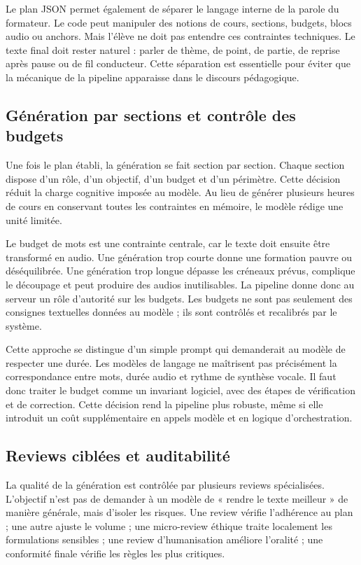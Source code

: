 \documentclass[12pt,a4paper]{article}
\begin{document}
Le plan JSON permet également de séparer le langage interne de la parole du formateur.
Le code peut manipuler des notions de cours, sections, budgets, blocs audio ou anchors.
Mais l'élève ne doit pas entendre ces contraintes techniques. Le texte final doit rester
naturel : parler de thème, de point, de partie, de reprise après pause ou de fil conducteur.
Cette séparation est essentielle pour éviter que la mécanique de la pipeline apparaisse
dans le discours pédagogique.

\subsection{Génération par sections et contrôle des budgets}

Une fois le plan établi, la génération se fait section par section. Chaque section dispose
d'un rôle, d'un objectif, d'un budget et d'un périmètre. Cette décision réduit la charge
cognitive imposée au modèle. Au lieu de générer plusieurs heures de cours en conservant
toutes les contraintes en mémoire, le modèle rédige une unité limitée.

Le budget de mots est une contrainte centrale, car le texte doit ensuite être transformé
en audio. Une génération trop courte donne une formation pauvre ou déséquilibrée. Une
génération trop longue dépasse les créneaux prévus, complique le découpage et peut
produire des audios inutilisables. La pipeline donne donc au serveur un rôle d'autorité sur
les budgets. Les budgets ne sont pas seulement des consignes textuelles données au
modèle ; ils sont contrôlés et recalibrés par le système.

Cette approche se distingue d'un simple prompt qui demanderait au modèle de respecter
une durée. Les modèles de langage ne maîtrisent pas précisément la correspondance entre
mots, durée audio et rythme de synthèse vocale. Il faut donc traiter le budget comme un
invariant logiciel, avec des étapes de vérification et de correction. Cette décision rend la
pipeline plus robuste, même si elle introduit un coût supplémentaire en appels modèle et
en logique d'orchestration.

\subsection{Reviews ciblées et auditabilité}

La qualité de la génération est contrôlée par plusieurs reviews spécialisées. L'objectif
n'est pas de demander à un modèle de « rendre le texte meilleur » de manière générale,
mais d'isoler les risques. Une review vérifie l'adhérence au plan ; une autre ajuste le
volume ; une micro-review éthique traite localement les formulations sensibles ; une
review d'humanisation améliore l'oralité ; une conformité finale vérifie les règles les plus
critiques.
\end{document}
